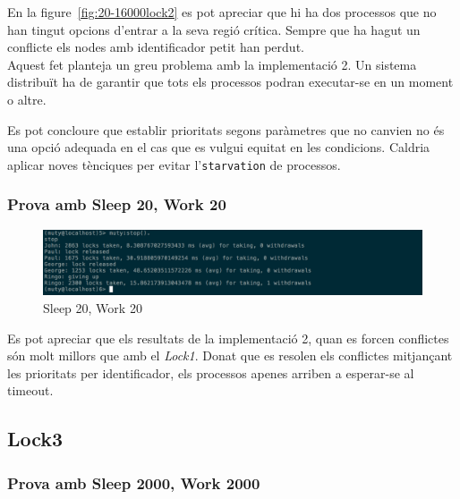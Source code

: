 \documentclass[a4paper, 11pt]{article}
\begin{document}
En la figure~\ref{fig:20-16000lock2} es pot apreciar que hi ha dos processos que no han tingut opcions d'entrar a la seva regió crítica. Sempre que ha hagut un conflicte els nodes amb identificador petit han perdut. \\
Aquest fet planteja un greu problema amb la implementació 2. Un sistema distribuït ha de garantir que tots els processos podran executar-se en un moment o altre. 

Es pot concloure que establir prioritats segons paràmetres que no canvien no és una opció adequada en el cas que es vulgui equitat en les condicions. Caldria aplicar noves tènciques per evitar l'\texttt{starvation} de processos.


\subsubsection{Prova amb Sleep 20, Work 20}

\begin{figure}[H]
    \centering
    \includegraphics[width=1.0\textwidth]{figures/20-20lock2}
    \caption{Sleep 20, Work 20 \label{fig:20-20lock2}}    
\end{figure}

Es pot apreciar que els resultats de la implementació 2, quan es forcen conflictes són molt millors que amb el \textit{Lock1}. Donat que es resolen els conflictes mitjançant les prioritats per identificador, els processos apenes arriben a esperar-se al timeout. 

\subsection{Lock3}

\subsubsection{Prova amb Sleep 2000, Work 2000}
\end{document}
